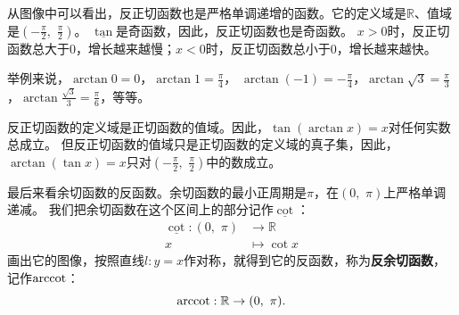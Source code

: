 \documentclass[12pt,UTF8,fontset=none]{ctexbook}
\begin{document}
从图像中可以看出，反正切函数也是严格单调递增的函数。它的定义域是$\mathbb{R}$、值域是$(-\frac{\pi}{2}, \,\, \frac{\pi}{2})$。
$\underline{\tan}$是奇函数，因此，反正切函数也是奇函数。
$x > 0$时，反正切函数总大于$0$，增长越来越慢；$x < 0$时，反正切函数总小于$0$，增长越来越快。

举例来说，$\arctan{0} = 0$，$\arctan{1} = \frac{\pi}{4}$，
$\arctan{(-1)} = -\frac{\pi}{4}$，$\arctan{\sqrt{3}} = \frac{\pi}{3}$，$\arctan{\frac{\sqrt{3}}{3}} = \frac{\pi}{6}$，等等。

反正切函数的定义域是正切函数的值域。因此，$\tan{(\arctan{x})} = x$对任何实数总成立。
但反正切函数的值域只是正切函数的定义域的真子集，因此，$\arctan{(\tan{x})} = x$只对$(-\frac{\pi}{2}, \,\, \frac{\pi}{2})$中的数成立。

最后来看余切函数的反函数。余切函数的最小正周期是$\pi$，在$(0, \,\, \pi)$上严格单调递减。
我们把余切函数在这个区间上的部分记作$\underline{\cot}$：
\begin{align*}
    \underline{\cot} : (0, \,\, \pi) &\rightarrow \mathbb{R}  \\
                                   x &\mapsto \cot{x} 
\end{align*}
画出它的图像，按照直线$l: y = x$作对称，就得到它的反函数，称为\textbf{反余切函数}，记作$\operatorname{arccot}$：
$$ \operatorname{arccot} : \mathbb{R} \rightarrow (0, \,\, \pi) . $$
\end{document}
